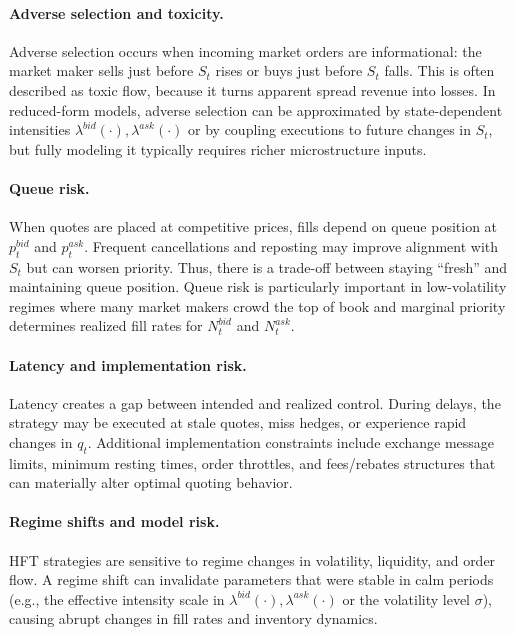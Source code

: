 \documentclass[a4paper,10pt,titlepage,oneside,openany]{book}
\theoremstyle{plain}\newtheorem{theorem}{Theorem}[chapter]
\theoremstyle{definition}\newtheorem{definition}{Definition}[chapter]
\theoremstyle{remark}\newtheorem{remark}{Remark}[chapter]
\begin{document}
\paragraph{Adverse selection and toxicity.}
Adverse selection occurs when incoming market orders are informational: the market maker sells just before $S_t$ rises or buys just before $S_t$ falls. This is often described as toxic flow, because it turns apparent spread revenue into losses. In reduced-form models, adverse selection can be approximated by state-dependent intensities $\lambda^{bid}(\cdot),\lambda^{ask}(\cdot)$ or by coupling executions to future changes in $S_t$, but fully modeling it typically requires richer microstructure inputs.

\paragraph{Queue risk.}
When quotes are placed at competitive prices, fills depend on queue position at $p_t^{bid}$ and $p_t^{ask}$. Frequent cancellations and reposting may improve alignment with $S_t$ but can worsen priority. Thus, there is a trade-off between staying ``fresh'' and maintaining queue position. Queue risk is particularly important in low-volatility regimes where many market makers crowd the top of book and marginal priority determines realized fill rates for $N_t^{bid}$ and $N_t^{ask}$.

\paragraph{Latency and implementation risk.}
Latency creates a gap between intended and realized control. During delays, the strategy may be executed at stale quotes, miss hedges, or experience rapid changes in $q_t$. Additional implementation constraints include exchange message limits, minimum resting times, order throttles, and fees/rebates structures that can materially alter optimal quoting behavior.

\paragraph{Regime shifts and model risk.}
HFT strategies are sensitive to regime changes in volatility, liquidity, and order flow. A regime shift can invalidate parameters that were stable in calm periods (e.g., the effective intensity scale in $\lambda^{bid}(\cdot),\lambda^{ask}(\cdot)$ or the volatility level $\sigma$), causing abrupt changes in fill rates and inventory dynamics.
\end{document}
